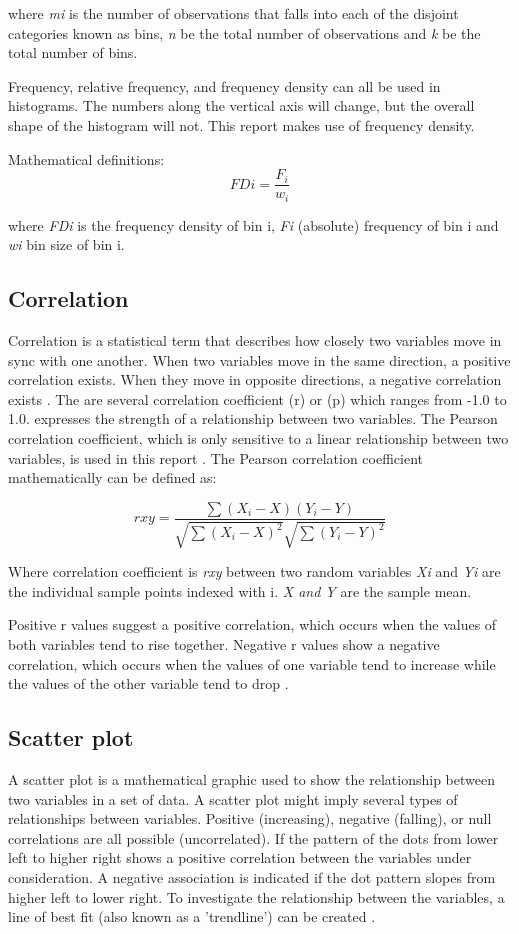 \documentclass[12 pt]{scrartcl}
\begin{document}
where \textit{mi} is the number of observations that falls into each of the disjoint categories known as bins,
\textit{n} be the total number of observations and 
\textit{k} be the total number of bins.

Frequency, relative frequency, and frequency density can all be used in histograms. The numbers along the vertical axis will change, but the overall shape of the histogram will not. This report makes use of frequency density.

Mathematical definitions:
\[ FDi = \frac{F_i}{w_i} \]

where \textit{FDi} is the frequency density of bin i,
\textit{Fi} (absolute) frequency of bin i and 
\textit{wi} bin size of bin i.

\subsection{Correlation}
Correlation is a statistical term that describes how closely two variables move in sync with one another. When two variables move in the same direction, a positive correlation exists. When they move in opposite directions, a negative correlation exists \citep{Stat_Methods}. The are several correlation coefficient (r) or (p) which ranges from -1.0 to 1.0. expresses the strength of a relationship between two variables. The Pearson correlation coefficient, which is only sensitive to a linear relationship between two variables, is used in this report \citep{Stat_Methods}. The Pearson correlation coefficient mathematically can be defined as:

\[ rxy = \frac{\sum(X_i-X)(Y_i-Y)} {\sqrt{ \sum(X_i-X)^2} \sqrt{\sum(Y_i-Y)^2}} \]

Where correlation coefficient is \textit{rxy} between two random variables \textit{Xi} and \textit{Yi} are the individual sample points indexed with i. \textit{X and Y} are the sample mean.

Positive r values suggest a positive correlation, which occurs when the values of both variables tend to rise together. Negative r values show a negative correlation, which occurs when the values of one variable tend to increase while the values of the other variable tend to drop \citep{Stat_Methods}.

\subsection{Scatter plot}
A scatter plot is a mathematical graphic used to show the relationship between two variables in a set of data. A scatter plot might imply several types of relationships between variables. Positive (increasing), negative (falling), or null correlations are all possible (uncorrelated). If the pattern of the dots from lower left to higher right shows a positive correlation between the variables under consideration. A negative association is indicated if the dot pattern slopes from higher left to lower right. To investigate the relationship between the variables, a line of best fit (also known as a 'trendline') can be created \citep{Stat_Methods}.
\end{document}
